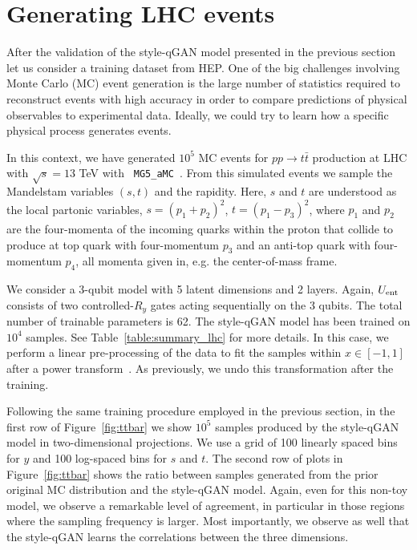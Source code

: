 \documentclass[twocolumn,preprintnumbers,superscriptaddress]{revtex4-2}
\begin{document}
\section{Generating LHC events}
\label{sec:lhc}

After the validation of the style-qGAN model presented in the previous section
let us consider a training dataset from HEP. One of the big challenges involving
Monte Carlo (MC) event generation is the large number of statistics required to
reconstruct events with high accuracy in order to compare predictions of
physical observables to experimental data. Ideally, we could try
to learn how a specific physical process generates events.

In this context, we have generated $10^5$ MC events for $pp\rightarrow t\bar{t}$
production at LHC with $\sqrt{s} = 13$ TeV with {\tt
MG5\_aMC}~\cite{Alwall:2014hca,Frederix:2018nkq}. From this simulated events we
sample the Mandelstam variables $(s,t)$ and the rapidity. Here, $s$
and $t$ are understood as the local partonic variables,
$s=(p_1^{}+p_2^{})^2$, $t=(p_1^{}-p_3^{})_{}^2$, where $p_1^{}$ and
$p_2^{}$ are the four-momenta of the incoming quarks within the proton that collide to produce at top quark with four-momentum $p_3^{}$ and an anti-top quark with four-momentum $p_4^{}$, all momenta given in, e.g. the center-of-mass frame.

We consider a 3-qubit model with 5 latent dimensions and 2 layers. Again,
$U_{\rm ent}$ consists of two controlled-$R_{y}$ gates acting sequentially on
the 3 qubits. The total number of trainable parameters is 62. The style-qGAN
model has been trained on $10^4$ samples. See Table~\ref{table:summary_lhc} for more details. In this case, we perform a linear pre-processing of the data
to fit the samples within $x \in [-1, 1]$ after a power
transform~\cite{yeo2000new}. As previously, we undo this transformation after
the training.

Following the same training procedure employed in the previous section, in the
first row of Figure~\ref{fig:ttbar} we show $10^5$ samples produced by the
style-qGAN model in two-dimensional projections. We use a grid of 100 linearly
spaced bins for $y$ and 100 log-spaced bins for $s$ and $t$.
%
The second row of plots in Figure~\ref{fig:ttbar} shows the ratio between
samples generated from the prior original MC distribution and the style-qGAN
model. Again, even for this non-toy model, we observe a remarkable level of agreement, in particular in those regions
where the sampling frequency is larger. Most importantly, we observe as well that the style-qGAN learns
the correlations between the three dimensions.
\end{document}
